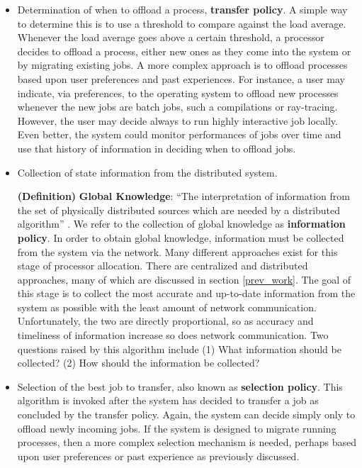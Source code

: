 \documentclass{report}
\newcommand{\definition}[3]{
	\textbf{(Definition)} \textbf{#1}: #2
	\label{#3}
}
\begin{document}
\begin{itemize}
	\item Determination of when to offload a process, \textbf{transfer
	policy}.  A simple way to determine this is to use a threshold to
	compare against the load average.  Whenever the load average goes
	above a certain threshold, a processor decides to offload a process,
	either new ones as they come into the system or by migrating
	existing jobs.  A more complex approach is to offload processes
	based upon user preferences and past experiences.  For instance, a
	user may indicate, via preferences, to the operating system to
	offload new processes whenever the new jobs are batch jobs, such a
	compilations or ray-tracing.  However, the user may decide always to
	run highly interactive job locally.  Even better, the system could
	monitor performances of jobs over time and use that history of
	information in deciding when to offload jobs.

	\item Collection of state information from the distributed system.
	\definition{Global Knowledge}{``The interpretation of information
	from the set of physically distributed sources which are needed by a
	distributed algorithm'' \cite{Casavant}}{def:global_know}.  We refer
	to the collection of global knowledge as \textbf{information
	policy}.  In order to obtain global knowledge, information must be
	collected from the system via the network.  Many different
	approaches exist for this stage of processor allocation.  There are
	centralized and distributed approaches, many of which are discussed
	in section \ref{prev_work}.  The goal of this stage is to collect
	the most accurate and up-to-date information from the system as
	possible with the least amount of network communication.
	Unfortunately, the two are directly proportional, so as accuracy and
	timeliness of information increase so does network communication.
	Two questions raised by this algorithm include (1) What information
	should be collected? (2) How should the information be collected?

	\item Selection of the best job to transfer, also known as
	\textbf{selection policy}.  This algorithm is invoked after the
	system has decided to transfer a job as concluded by the transfer
	policy.  Again, the system can decide simply only to offload newly
	incoming jobs.  If the system is designed to migrate running
	processes, then a more complex selection mechanism is needed,
	perhaps based upon user preferences or past experience as previously
	discussed.


\end{itemize}
\end{document}
